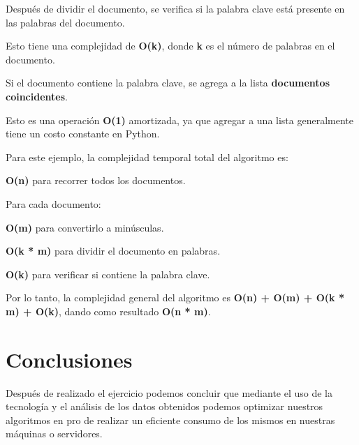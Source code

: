 \documentclass[journal, spanish]{IEEEtran}
\begin{document}
Después de dividir el documento, se verifica si la palabra clave está presente en las palabras del documento.

Esto tiene una complejidad de \textbf{O(k)}, donde \textbf{k} es el número de palabras en el documento.

Si el documento contiene la palabra clave, se agrega a la lista \textbf{documentos coincidentes}.

Esto es una operación \textbf{O(1)} amortizada, ya que agregar a una lista generalmente tiene un costo constante en Python.

Para este ejemplo, la complejidad temporal total del algoritmo es:

\textbf{O(n)} para recorrer todos los documentos.

Para cada documento:

\textbf{O(m)} para convertirlo a minúsculas.

\textbf{O(k * m)} para dividir el documento en palabras.

\textbf{O(k)} para verificar si contiene la palabra clave.

Por lo tanto, la complejidad general del algoritmo es \textbf{O(n) + O(m) + O(k * m) + O(k)}, dando como resultado \textbf{O(n * m)}.

\section{Conclusiones}
Después de realizado el ejercicio podemos concluir que mediante el uso de la tecnología y el análisis de los datos obtenidos podemos optimizar nuestros algoritmos en pro de realizar un eficiente consumo de los mismos en nuestras máquinas o servidores.



\cite{assailly2017road}
\cite{johnsson2018search}
\cite{wegman2017future}


\vspace{12pt}
\end{document}
